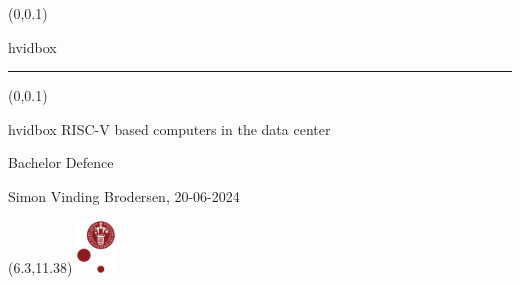 \documentclass[t, 10pt, aspectratio=169]{beamer}
\begin{document}
{
\begin{frame}
	\begin{textblock*}{\textwidth}(0\textwidth,0.1\textheight)
		\begin{beamercolorbox}[wd=7.8cm,ht=7.3cm,sep=0.5cm]{hvidbox}
			\fontsize{5}{10}\selectfont {}
			\noindent\textcolor{KUrod}{\rule{6.8cm}{0.4pt}}
		\end{beamercolorbox}
	\end{textblock*}
	\begin{textblock*}{\textwidth}(0\textwidth,0.1\textheight)
		\begin{beamercolorbox}[wd=7.8cm,sep=0.5cm]{hvidbox}
			\Huge \textcolor{KUrod}{RISC-V based computers in the data
				center}
			\vspace{0.5cm}
			\par
			\Large Bachelor Defence
			\vspace{0.5cm}
			\par
			\normalsize Simon Vinding Brodersen, 20-06-2024
		\end{beamercolorbox}
	\end{textblock*}
	\begin{textblock}{1}(6.3,11.38)
		\includegraphics[width=1cm]{KU/KU-logo.png}
	\end{textblock}
\end{frame}
}








\end{document}
